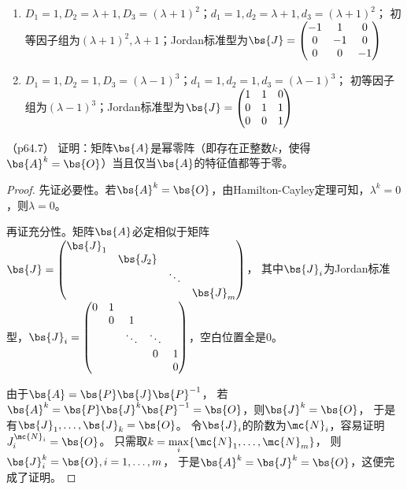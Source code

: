 \documentclass[12pt, a4paper, oneside, UTF8]{ctexbook}
\begin{document}
\begin{solution}
    \begin{enumerate}[label=(\arabic*)]
        \item $D_1=1,D_2=\lambda+1,D_3=(\lambda+1)^2$；$d_1=1,d_2=\lambda+1,d_3=(\lambda+1)^2$；
        初等因子组为$(\lambda+1)^2,\lambda+1$；Jordan标准型为$\bs{J}=\begin{pmatrix}
            -1 & 1& 0\\
            0 & -1& 0 \\
            0 &0 & -1
        \end{pmatrix}$
        \item $D_1=1,D_2=1,D_3=(\lambda-1)^3$；$d_1=1,d_2=1,d_3=(\lambda-1)^3$；
        初等因子组为$(\lambda-1)^3$；Jordan标准型为$\bs{J}=\begin{pmatrix}
            1 & 1& 0\\
            0 & 1& 1 \\
            0 &0 & 1
        \end{pmatrix}$
    \end{enumerate}
\end{solution}

\begin{question}（p64.7）
    证明：矩阵$\bs{A}$是幂零阵（即存在正整数$k$，使得$\bs{A}^k=\bs{O}$）当且仅当$\bs{A}$的特征值都等于零。
\end{question}

\begin{proof}
    先证必要性。若$\bs{A}^k=\bs{O}$，由Hamilton-Cayley定理可知，$\lambda^k=0$，则$\lambda=0$。

    再证充分性。矩阵$\bs{A}$必定相似于矩阵$\bs{J}
        =\begin{pmatrix}
            \bs{J}_1 & & & \\
            & \bs{J_2} & & \\
            & & \ddots & \\
            & & & \bs{J}_m
        \end{pmatrix}$，
    其中$\bs{J}_i$为Jordan标准型，$\bs{J}_i=\begin{pmatrix}
        0 & 1 & & \\
        & 0 & 1& &\\
        & & \ddots & \ddots\\
        & & & 0& 1\\
        & & & & 0
    \end{pmatrix}$，空白位置全是0。

    由于$\bs{A}=\bs{P}\bs{J}\bs{P}^{-1}$，
    若$\bs{A}^k=\bs{P}\bs{J}^k\bs{P}^{-1}=\bs{O}$，则$\bs{J}^k=\bs{O}$，
    于是有$\bs{J}_1,\ldots,\bs{J}_k=\bs{O}$。
    令$\bs{J}_i$的阶数为$\mc{N}_i$，容易证明$J_i^{\mc{N}_i}=\bs{O}$。
    只需取$k=\max\limits_i\{\mc{N}_1,\ldots,\mc{N}_m\}$，
    则$\bs{J}_i^k=\bs{O},i=1,\ldots,m$，
    于是$\bs{A}^k=\bs{J}^k=\bs{O}$，这便完成了证明。
\end{proof}
\end{document}
